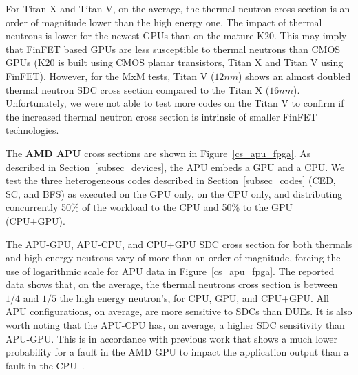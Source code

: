 For Titan X and Titan V, on the average, the thermal neutron cross section is an order of magnitude lower than the high energy one. The impact of thermal neutrons is lower for the newest GPUs than on the mature K20. This may imply that
FinFET based GPUs are less susceptible to thermal neutrons than CMOS GPUs (K20 is built using CMOS planar transistors, Titan X and Titan V using FinFET). However, for the MxM tests, Titan V
($12nm$) shows an almost doubled thermal neutron SDC cross section compared to
the Titan X ($16nm$). Unfortunately, we were not able to test more codes on
the Titan V to confirm if the increased thermal neutron cross section is intrinsic of smaller FinFET technologies.


The \textbf{AMD APU} cross sections are shown in Figure~\ref{cs_apu_fpga}. As described in Section~\ref{subsec_devices}, the APU embeds a GPU and a CPU. We test the three heterogeneous codes described in Section~\ref{subsec_codes} (CED, SC, and BFS) as executed on the GPU only, on the CPU only, and distributing concurrently 50\% of the workload to the CPU and 50\% to the GPU (CPU+GPU).

The APU-GPU, APU-CPU, and CPU+GPU SDC cross section for both thermals and high energy neutrons vary of more than an order of magnitude, forcing the use of logarithmic scale for APU data in Figure~\ref{cs_apu_fpga}. The reported data shows that, on the average, the thermal neutrons cross section is  between $1/4$ and $1/5$ the high energy neutron's, for CPU, GPU, and CPU+GPU.
All APU configurations, on average, are more sensitive to SDCs than DUEs. It is also worth noting that the APU-CPU has, on average, a higher SDC sensitivity than APU-GPU. This is in accordance with previous work that shows a much lower probability for a fault in the AMD GPU to impact the application output than a fault in the CPU~\cite{Jeon2013ArchitecturalVM}. %


